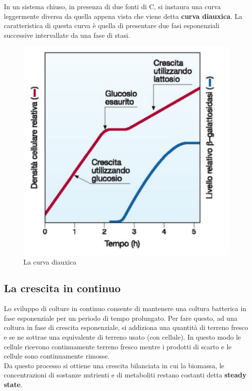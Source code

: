 \documentclass[11pt]{book}
\begin{document}
In un sistema chiuso, in presenza di due fonti di C, si instaura una curva leggermente diversa da quella appena vista che viene detta \textbf{curva diauxica}. La caratteristica di questa curva è quella di presentare due fasi esponenziali successive intervallate da una fase di stasi.

\clearpage
\begin{figure}[htp]
\centering
\includegraphics[scale=0.5]{img/Curva diauxica.png}
\caption{La curva diauxica}
\label{}
\end{figure}

\subsection{La crescita in continuo}
Lo sviluppo di colture in continuo consente di mantenere una coltura batterica in fase esponenziale per un periodo di tempo prolungato.
Per fare questo, ad una coltura in fase di crescita esponenziale, si addiziona una quantità di terreno fresco e se ne sottrae una equivalente di terreno usato (con cellule). In questo modo le cellule ricevono continuamente terreno fresco mentre i prodotti di scarto e le cellule sono continuamente rimosse.\\ 
Da questo processo si ottiene una crescita bilanciata in cui la biomassa, le concentrazioni di sostanze nutrienti e di metaboliti restano costanti detta \textbf{steady state}.
\end{document}
